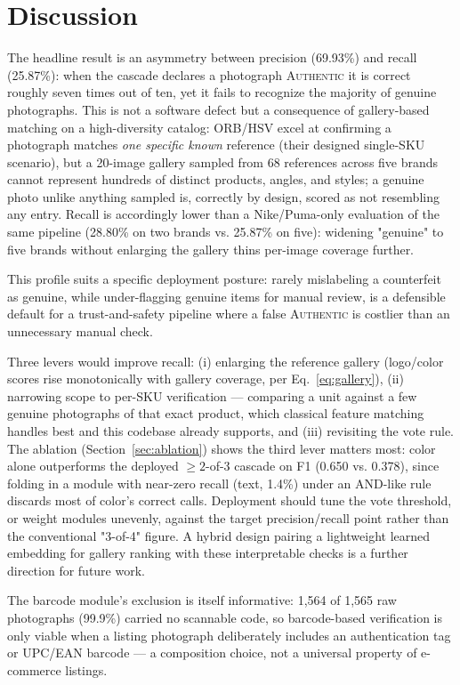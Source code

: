 \documentclass[conference]{IEEEtran}
\begin{document}
\section{Discussion}
\label{sec:discussion}

The headline result is an asymmetry between precision (69.93\%) and
recall (25.87\%): when the cascade declares a photograph
\textsc{Authentic} it is correct roughly seven times out of ten, yet it
fails to recognize the majority of genuine photographs. This is not a
software defect but a consequence of gallery-based matching on a
high-diversity catalog: ORB/HSV excel at confirming a photograph matches
\emph{one specific known} reference (their designed single-SKU
scenario), but a 20-image gallery sampled from 68 references across five
brands cannot represent hundreds of distinct products, angles, and
styles; a genuine photo unlike anything sampled is, correctly by design,
scored as not resembling any entry. Recall is accordingly lower than a
Nike/Puma-only evaluation of the same pipeline (28.80\% on two brands
vs. 25.87\% on five): widening "genuine" to five brands without
enlarging the gallery thins per-image coverage further.

This profile suits a specific deployment posture: rarely mislabeling a
counterfeit as genuine, while under-flagging genuine items for manual
review, is a defensible default for a trust-and-safety pipeline where a
false \textsc{Authentic} is costlier than an unnecessary manual check.

Three levers would improve recall: (i) enlarging the reference gallery
(logo/color scores rise monotonically with gallery coverage, per
Eq.~\eqref{eq:gallery}), (ii) narrowing scope to per-SKU verification ---
comparing a unit against a few genuine photographs of that exact
product, which classical feature matching handles best and this
codebase already supports, and (iii) revisiting the vote rule. The
ablation (Section~\ref{sec:ablation}) shows the third lever matters
most: color alone outperforms the deployed $\geq 2$-of-3 cascade on F1
(0.650 vs. 0.378), since folding in a module with near-zero recall
(text, 1.4\%) under an AND-like rule discards most of color's correct
calls. Deployment should tune the vote threshold, or weight modules
unevenly, against the target precision/recall point rather than the
conventional "3-of-4" figure. A hybrid design pairing a lightweight
learned embedding for gallery ranking with these interpretable checks is
a further direction for future work.

The barcode module's exclusion is itself informative: 1{,}564 of 1{,}565
raw photographs (99.9\%) carried no scannable code, so barcode-based
verification is only viable when a listing photograph deliberately
includes an authentication tag or UPC/EAN barcode --- a composition
choice, not a universal property of e-commerce listings.
\end{document}
